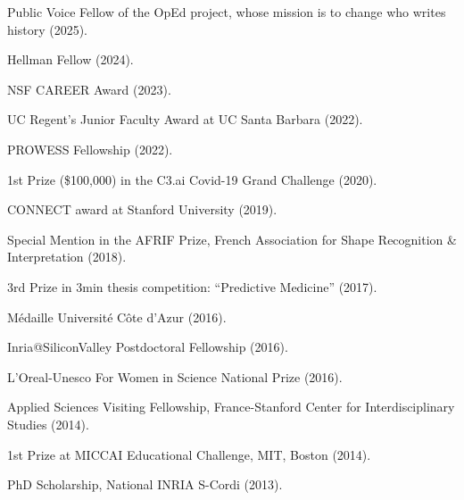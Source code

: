 Public Voice Fellow of the OpEd project, whose mission is to change who writes history (2025).

Hellman Fellow (2024).

NSF CAREER Award (2023).

UC Regent’s Junior Faculty Award at UC Santa Barbara (2022).

PROWESS Fellowship (2022).

1st Prize (\$100,000) in the C3.ai Covid-19 Grand Challenge (2020).

CONNECT award at Stanford University (2019).

Special Mention in the AFRIF Prize, French Association for Shape Recognition \& Interpretation (2018).

3rd Prize in 3min thesis competition: “Predictive Medicine” (2017).

Médaille Université Côte d’Azur (2016).

Inria@SiliconValley Postdoctoral Fellowship (2016).

L'Oreal-Unesco For Women in Science National Prize (2016).

Applied Sciences Visiting Fellowship, France-Stanford Center for Interdisciplinary Studies (2014).

1st Prize at MICCAI Educational Challenge, MIT, Boston (2014).

PhD Scholarship, National INRIA S-Cordi (2013).